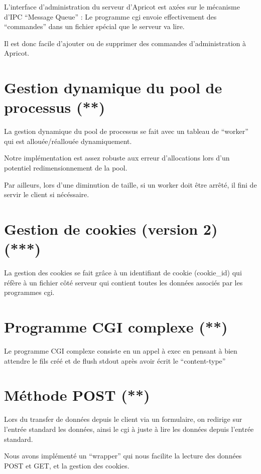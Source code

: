 \documentclass{article}
\begin{document}
L'interface d'administration du serveur d'Apricot est axées sur le mécanisme d'IPC ``Message Queue'' :
Le programme cgi envoie effectivement des ``commandes'' dans un fichier spécial que le serveur va lire.

Il est donc facile d'ajouter ou de supprimer des commandes d'administration à Apricot.

\section{Gestion dynamique du pool de processus (**)}

La gestion dynamique du pool de processus se fait avec un tableau de ``worker'' qui est allouée/réallouée dynamiquement.

Notre implémentation est assez robuste aux erreur d'allocations lors d'un potentiel redimensionnement de la pool.

Par ailleurs, lors d'une diminution de taille, si un worker doit être arrêté, il fini de servir le client si nécéssaire.

\section{Gestion de cookies (version 2) (***)}

La gestion des cookies se fait grâce à un identifiant de cookie (cookie\_id) qui réfère à un fichier côté serveur qui contient toutes les données associés par les programmes cgi.

\section{Programme CGI complexe (**)}

Le programme CGI complexe consiste en un appel à exec en pensant à bien attendre le fils créé et de flush stdout après avoir écrit le ``content-type''

\section{Méthode POST (**)}

Lors du transfer de données depuis le client via un formulaire, on redirige sur l'entrée standard les données, ainsi le cgi à juste à lire les données depuis l'entrée standard.

Nous avons implémenté un ``wrapper'' qui nous facilite la lecture des données POST et GET, et la gestion des cookies.
\end{document}
